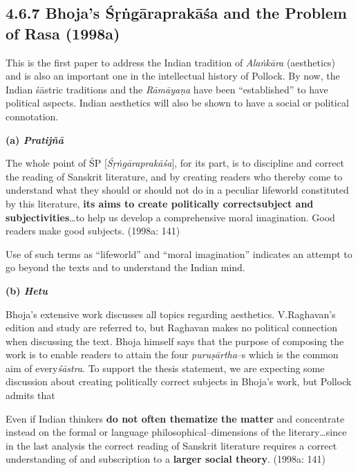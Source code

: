\subsection*{4.6.7 Bhoja's Śṛṅgāraprakāśa and the Problem of Rasa (1998a)}

This is the first paper to address the Indian tradition of \textit{Alaṅkāra }(aesthetics) and is also an important one in the intellectual history of Pollock. By now, the Indian śāstric traditions and the \textit{Rāmāyaṇa} have been “established” to have political aspects. Indian aesthetics will also be shown to have a social or political connotation.

\newpage

\textbf{(a) \textit{Pratijñā}}

\begin{myquote}
The whole point of ŚP [\textit{Śṛṅgāraprakāśa}], for its part, is to discipline and correct the reading of Sanskrit literature, and by creating readers who thereby come to understand what they should or should not do in a peculiar lifeworld constituted by this literature, \textbf{its aims to create politically correct}\textbf{subject and subjectivities}…to help us develop a comprehensive moral imagination. Good readers make good subjects. (1998a: 141)
\end{myquote}

Use of such terms as “lifeworld” and “moral imagination” indicates an attempt to go beyond the texts and to understand the Indian mind.

\textbf{(b) \textit{Hetu}}

Bhoja’s extensive work discusses all topics regarding aesthetics. V.Raghavan’s edition and study are referred to, but Raghavan makes no political connection when discussing the text. Bhoja himself says that the purpose of composing the work is to enable readers to attain the four \textit{puruṣārtha}–s which is the common aim of every\textit{śāstra}. To support the thesis statement, we are expecting some discussion about creating politically correct subjects in Bhoja’s work, but Pollock admits that

\begin{myquote}
Even if Indian thinkers \textbf{do not often thematize the matter} and concentrate instead on the formal or language philosophical–dimensions of the literary…since in the last analysis the correct reading of Sanskrit literature requires a correct understanding of and subscription to a \textbf{larger social theory}. (1998a: 141)
\end{myquote}

